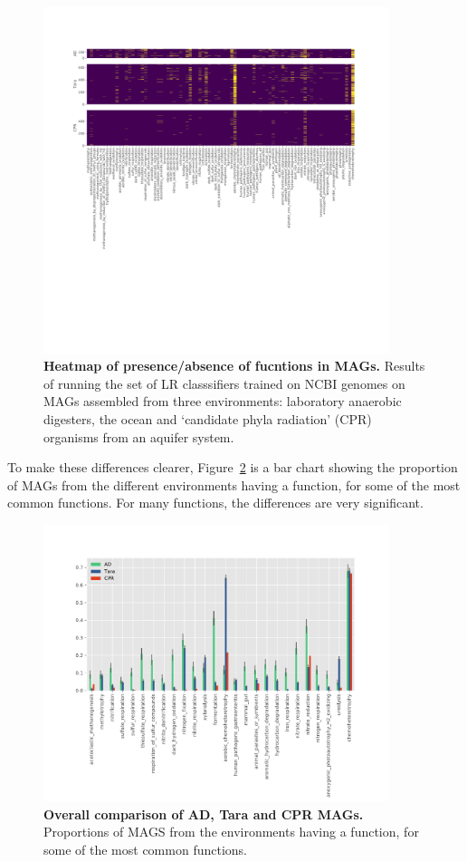 \documentclass[10pt,letterpaper]{article}
\begin{document}
\begin{figure}
\includegraphics[width=0.9\textwidth]{mag_heatmaps_cpr}
\caption{{\bf Heatmap of presence/absence of fucntions in MAGs.}
Results of running the set of LR classsifiers trained on NCBI genomes on MAGs assembled from three environments: laboratory anaerobic digesters, the ocean and `candidate phyla radiation' (CPR) organisms from an aquifer system.}
\label{heatmap}
\end{figure}

To make these differences clearer, Figure~\ref{mag-compare} is a bar chart showing the proportion of MAGs from the different environments having a function, for some of the most common functions. For many functions, the differences are very significant. 

\begin{figure}
\includegraphics[width=0.9\textwidth]{mag_comparison_bars_cpr}
\caption{{\bf Overall comparison of AD, Tara and CPR MAGs.}
Proportions of MAGS from the environments having a function, for some of the most common functions.}
\label{mag-compare}
\end{figure}
\end{document}
